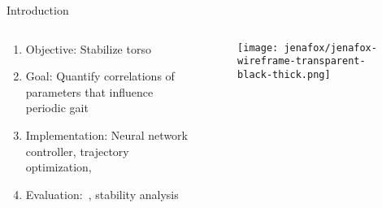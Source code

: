 \begin{frame}{Introduction}%
    \begin{columns}[T,onlytextwidth]%
        \begin{column}[T]{0.48\textwidth}%
            \begin{enumerate}
                \item Objective: Stabilize torso
                \item Goal: Quantify correlations of parameters that influence periodic gait
                \item Implementation: Neural network controller, trajectory optimization,~
                \item Evaluation:~, stability analysis
            \end{enumerate}%
        \end{column}%
        \begin{column}[T]{0.48\textwidth}%
            \begin{figure}[htb]%
                \centering%
                \texttt{[image: jenafox/jenafox-wireframe-transparent-black-thick.png]}%
            \end{figure}%
        \end{column}%
    \end{columns}%
\end{frame}%
%